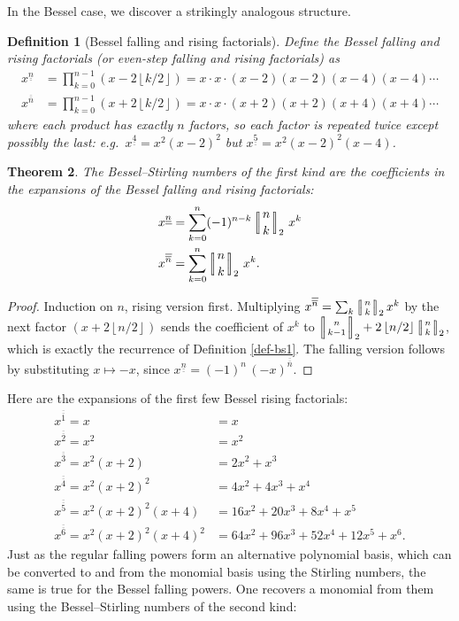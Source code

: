 \documentclass[a4paper]{amsart}
\numberwithin{equation}{section}
\newcommand{\mStirlingone}[2]{\left[\mkern-3.8mu\middle|\genfrac{}{}{0pt}{}{#1}{#2}\middle|\mkern-3.8mu\right]}
\newcommand{\uuline}[1]{\underline{\underline{#1}}}
\newcommand{\ooline}[1]{\overline{\overline{#1}}}
\newcommand{\floor}[1]{\left\lfloor #1 \right\rfloor}
\newtheorem{theorem}{Theorem}[section]
\newtheorem{definition}[theorem]{Definition}
\begin{document}
In the Bessel case, we discover a strikingly analogous structure.
\begin{definition}[Bessel falling and rising factorials]\label{def-bessel-factorials}
Define the Bessel falling and rising factorials (or even-step falling and rising factorials) as
\[
\begin{aligned}
    x^{\uuline{n}} &= \prod_{k=0}^{n-1}\left(x-2\floor{k/2}\right) = x\cdot x\cdot (x-2)(x-2)(x-4)(x-4)\cdots \\
    x^{\ooline{n}} &= \prod_{k=0}^{n-1}\left(x+2\floor{k/2}\right) = x\cdot x\cdot (x+2)(x+2)(x+4)(x+4)\cdots
\end{aligned}
\]
where each product has exactly $n$ factors, so each factor is repeated twice except possibly the last: e.g.\ $x^{\uuline{4}} = x^2(x-2)^2$ but $x^{\uuline{5}} = x^2(x-2)^2(x-4)$.
\end{definition}
\begin{theorem}\label{thm-bessel-factorial-expansion}
The Bessel--Stirling numbers of the first kind are the coefficients in the expansions of the Bessel falling and rising factorials:
\[
\begin{aligned}
    x^{\uuline{n}} &= \sum_{k=0}^n (-1)^{n-k} \mStirlingone{n}{k}_2\, x^k\\
    x^{\ooline{n}} &= \sum_{k=0}^n \mStirlingone{n}{k}_2\, x^k.
\end{aligned}
\]
\end{theorem}
\begin{proof}
Induction on $n$, rising version first. Multiplying $x^{\ooline{n}} = \sum_k \mStirlingone{n}{k}_2 x^k$ by the next factor $(x + 2\floor{n/2})$ sends the coefficient of $x^k$ to $\mStirlingone{n}{k-1}_2 + 2\floor{n/2}\mStirlingone{n}{k}_2$, which is exactly the recurrence of Definition \ref{def-bs1}. The falling version follows by substituting $x \mapsto -x$, since $x^{\uuline{n}} = (-1)^n\, (-x)^{\ooline{n}}$.
\end{proof}
Here are the expansions of the first few Bessel rising factorials:
\[
\begin{aligned}
     x^{\ooline{1}} = x &= x \\
     x^{\ooline{2}} = x^2 &= x^2 \\
     x^{\ooline{3}} = x^2(x+2) &= 2x^2+x^3 \\
     x^{\ooline{4}} = x^2(x+2)^2 &= 4x^2+4x^3+x^4 \\
     x^{\ooline{5}} = x^2(x+2)^2(x+4) &= 16x^2+20x^3+8x^4+x^5 \\
     x^{\ooline{6}} = x^2(x+2)^2(x+4)^2 &= 64x^2+96x^3+52x^4+12x^5 +x^6.
\end{aligned}
\]
Just as the regular falling powers form an alternative polynomial basis, which can be converted to and from the monomial basis using the Stirling numbers, the same is true for the Bessel falling powers. One recovers a monomial from them using the Bessel--Stirling numbers of the second kind:
\end{document}
